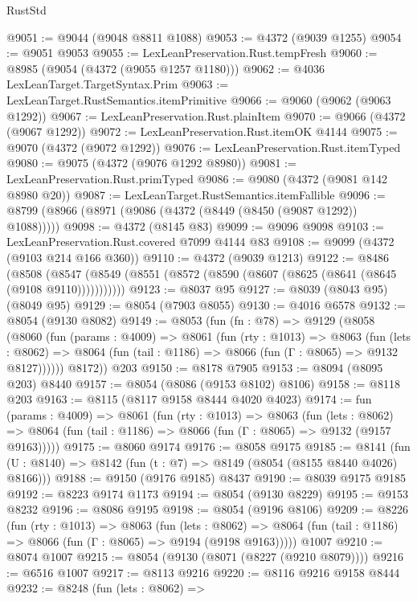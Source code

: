 \begin{lexlean}{RustStd}
\begin{coremodule}
@9051 := @9044 (@9048 @8811 @1088)
@9053 := @4372 (@9039 @1255)
@9054 := @9051 @9053
@9055 := LexLeanPreservation.Rust.tempFresh
@9060 := @8985 (@9054 (@4372 (@9055 @1257 @1180)))
@9062 := @4036 LexLeanTarget.TargetSyntax.Prim
@9063 := LexLeanTarget.RustSemantics.itemPrimitive
@9066 := @9060 (@9062 (@9063 @1292))
@9067 := LexLeanPreservation.Rust.plainItem
@9070 := @9066 (@4372 (@9067 @1292))
@9072 := LexLeanPreservation.Rust.itemOK @4144
@9075 := @9070 (@4372 (@9072 @1292))
@9076 := LexLeanPreservation.Rust.itemTyped
@9080 := @9075 (@4372 (@9076 @1292 @8980))
@9081 := LexLeanPreservation.Rust.primTyped
@9086 := @9080 (@4372 (@9081 @142 @8980 @20))
@9087 := LexLeanTarget.RustSemantics.itemFallible
@9096 := @8799 (@8966 (@8971 (@9086 (@4372 (@8449 (@8450 (@9087 @1292)) @1088)))))
@9098 := @4372 (@8145 @83)
@9099 := @9096 @9098
@9103 := LexLeanPreservation.Rust.covered @7099 @4144 @83
@9108 := @9099 (@4372 (@9103 @214 @166 @360))
@9110 := @4372 (@9039 @1213)
@9122 := @8486
    (@8508 (@8547 (@8549 (@8551 (@8572 (@8590 (@8607 (@8625 (@8641 (@8645 (@9108 @9110)))))))))))
@9123 := @8037 @95
@9127 := @8039 (@8043 @95) (@8049 @95)
@9129 := @8054 (@7903 @8055)
@9130 := @4016 @6578
@9132 := @8054 (@9130 @8082)
@9149 := @8053
    (fun (fn : @78) =>
    @9129
      (@8058
        (@8060
          (fun (params : @4009) =>
          @8061
            (fun (rty : @1013) =>
            @8063
              (fun (lets : @8062) =>
              @8064 (fun (tail : @1186) => @8066 (fun (Γ : @8065) => @9132 @8127))))))
        @8172))
    @203
@9150 := @8178 @7905
@9153 := @8094 (@8095 @203) @8440
@9157 := @8054 (@8086 (@9153 @8102) @8106)
@9158 := @8118 @203
@9163 := @8115 (@8117 @9158 @8444 @4020 @4023)
@9174 := fun (params : @4009) =>
  @8061
    (fun (rty : @1013) =>
    @8063
      (fun (lets : @8062) =>
      @8064 (fun (tail : @1186) => @8066 (fun (Γ : @8065) => @9132 (@9157 @9163)))))
@9175 := @8060 @9174
@9176 := @8058 @9175
@9185 := @8141 (fun (U : @8140) => @8142 (fun (t : @7) => @8149 (@8054 (@8155 @8440 @4026) @8166)))
@9188 := @9150 (@9176 @9185) @8437
@9190 := @8039 @9175 @9185
@9192 := @8223 @9174 @1173
@9194 := @8054 (@9130 @8229)
@9195 := @9153 @8232
@9196 := @8086 @9195
@9198 := @8054 (@9196 @8106)
@9209 := @8226
    (fun (rty : @1013) =>
    @8063
      (fun (lets : @8062) =>
      @8064 (fun (tail : @1186) => @8066 (fun (Γ : @8065) => @9194 (@9198 @9163)))))
    @1007
@9210 := @8074 @1007
@9215 := @8054 (@9130 (@8071 (@8227 (@9210 @8079))))
@9216 := @6516 @1007
@9217 := @8113 @9216
@9220 := @8116 @9216 @9158 @8444
@9232 := @8248
    (fun (lets : @8062) =>

\end{coremodule}
\end{lexlean}
